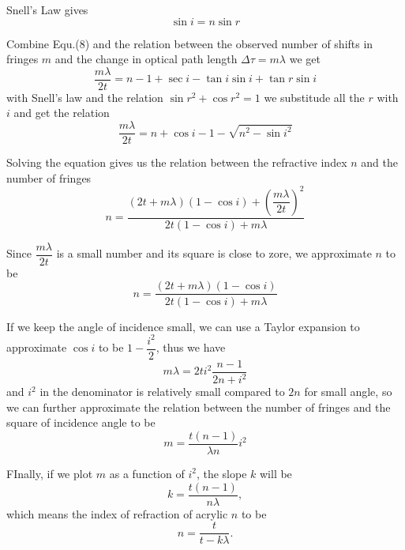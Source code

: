 \documentclass{article}
\begin{document}
Snell's Law gives
\begin{equation}
	\sin{i}=n\sin{r}
\end{equation}

Combine Equ.(8) and the relation between the observed number of shifts in fringes $m$ and the change in optical path length $\Delta{\tau}=m\lambda$ we get
\begin{equation}
\dfrac{m\lambda}{2t}=n-1+\sec{i}-\tan{i}\sin{i}+\tan{r}\sin{i}
\end{equation}
with Snell's law and the relation $\sin{r}^{2}+\cos{r}^{2}=1$ we substitude all the $r$ with $i$ and get the relation 
\begin{equation}
\dfrac{m\lambda}{2t}=n+\cos{i}-1-\sqrt{n^{2}-\sin{i}^{2}}
\end{equation}

Solving the equation gives us the relation between the refractive index $n$ and the number of fringes
\begin{equation}
	n=\dfrac{(2t+m\lambda)(1-\cos{i})+(\dfrac{m\lambda}{2t})^{2}}{2t(1-\cos{i})+m\lambda}
\end{equation}

Since $\dfrac{m\lambda}{2t}$ is a small number and its square is close to zore, we approximate $n$ to be 
\begin{equation}
n=\dfrac{(2t+m\lambda)(1-\cos{i})}{2t(1-\cos{i})+m\lambda}
\end{equation}

If we keep the angle of incidence small, we can use a Taylor expansion to approximate $\cos{i}$ to be $1-\dfrac{i^{2}}{2}$, thus we have
\begin{equation}
	m\lambda=2ti^{2}\dfrac{n-1}{2n+i^{2}}
\end{equation}
and $i^{2}$ in the denominator is relatively small compared to $2n$ for small angle, so we can further approximate the relation between the number of fringes and the square of incidence angle to be
\begin{equation}
	m=\dfrac{t(n-1)}{\lambda{n}}i^{2}
\end{equation} 

FInally, if we plot $m$ as a function of $i^{2}$, the slope $k$ will be
\begin{equation}
	k=\dfrac{t(n-1)}{n\lambda},
\end{equation}
which means the index of refraction of acrylic $n$ to be 
\begin{equation}
	n=\dfrac{t}{t-k\lambda}.
\end{equation}
\end{document}
